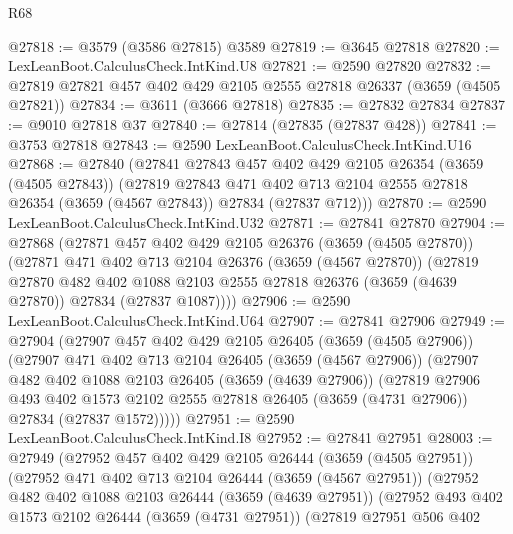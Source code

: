 \begin{lexlean}{R68}
\begin{coremodule}
@27818 := @3579 (@3586 @27815) @3589
@27819 := @3645 @27818
@27820 := LexLeanBoot.CalculusCheck.IntKind.U8
@27821 := @2590 @27820
@27832 := @27819 @27821 @457 @402 @429 @2105 @2555 @27818 @26337 (@3659 (@4505 @27821))
@27834 := @3611 (@3666 @27818)
@27835 := @27832 @27834
@27837 := @9010 @27818 @37
@27840 := @27814 (@27835 (@27837 @428))
@27841 := @3753 @27818
@27843 := @2590 LexLeanBoot.CalculusCheck.IntKind.U16
@27868 := @27840
    (@27841
      @27843
      @457
      @402
      @429
      @2105
      @26354
      (@3659 (@4505 @27843))
      (@27819
        @27843
        @471
        @402
        @713
        @2104
        @2555
        @27818
        @26354
        (@3659 (@4567 @27843))
        @27834
        (@27837 @712)))
@27870 := @2590 LexLeanBoot.CalculusCheck.IntKind.U32
@27871 := @27841 @27870
@27904 := @27868
    (@27871
      @457
      @402
      @429
      @2105
      @26376
      (@3659 (@4505 @27870))
      (@27871
        @471
        @402
        @713
        @2104
        @26376
        (@3659 (@4567 @27870))
        (@27819
          @27870
          @482
          @402
          @1088
          @2103
          @2555
          @27818
          @26376
          (@3659 (@4639 @27870))
          @27834
          (@27837 @1087))))
@27906 := @2590 LexLeanBoot.CalculusCheck.IntKind.U64
@27907 := @27841 @27906
@27949 := @27904
    (@27907
      @457
      @402
      @429
      @2105
      @26405
      (@3659 (@4505 @27906))
      (@27907
        @471
        @402
        @713
        @2104
        @26405
        (@3659 (@4567 @27906))
        (@27907
          @482
          @402
          @1088
          @2103
          @26405
          (@3659 (@4639 @27906))
          (@27819
            @27906
            @493
            @402
            @1573
            @2102
            @2555
            @27818
            @26405
            (@3659 (@4731 @27906))
            @27834
            (@27837 @1572)))))
@27951 := @2590 LexLeanBoot.CalculusCheck.IntKind.I8
@27952 := @27841 @27951
@28003 := @27949
    (@27952
      @457
      @402
      @429
      @2105
      @26444
      (@3659 (@4505 @27951))
      (@27952
        @471
        @402
        @713
        @2104
        @26444
        (@3659 (@4567 @27951))
        (@27952
          @482
          @402
          @1088
          @2103
          @26444
          (@3659 (@4639 @27951))
          (@27952
            @493
            @402
            @1573
            @2102
            @26444
            (@3659 (@4731 @27951))
            (@27819
              @27951
              @506
              @402

\end{coremodule}
\end{lexlean}
